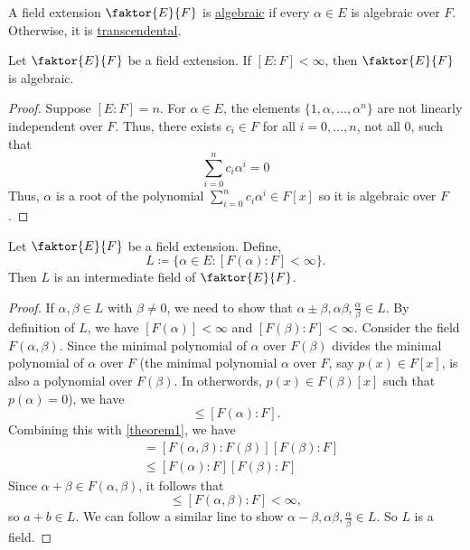 \documentclass[11pt]{article}
\newcommand{\quotient}[2]{\faktor{#1}{#2}}
\begin{document}
\begin{definition}
A field extension $\quotient{E}{F}$ is \underline{algebraic} if every $\alpha
\in E$ is algebraic over $F$. Otherwise, it is \underline{transcendental}.
\end{definition}
\begin{theorem} \label{theorem6}
Let $\quotient{E}{F}$ be a field extension. If $[E:F] < \infty$, then
$\quotient{E}{F}$ is algebraic.
\end{theorem}
\begin{proof}
Suppose $[E:F] = n$. For $\alpha \in E$, the elements $\{1, \alpha, \dots,
\alpha^n\}$ are not linearly independent over $F$. Thus, there exists $c_i \in
F$ for all $i = 0, \dots , n$, not all 0, such that
\begin{equation*}
\sum^n_{i = 0} c_i\alpha^i = 0
\end{equation*}
Thus, $\alpha$ is a root of the polynomial $\sum^n_{i = 0} c_i\alpha^i \in
F[x]$ so it is algebraic over $F$.
\end{proof}
\begin{theorem}
Let $\quotient{E}{F}$ be a field extension. Define,
\begin{equation*}
L \coloneqq \{\alpha \in E: [F(\alpha) : F] < \infty\}.
\end{equation*}
Then $L$ is an intermediate field of $\quotient{E}{F}$.
\end{theorem}
\begin{proof}
If $\alpha, \beta \in L$ with $\beta \neq 0$, we need to show that $\alpha \pm
\beta, \alpha\beta, \frac{\alpha}{\beta} \in L$. By definition of $L$, we have
$[F(\alpha)] < \infty$ and $[F(\beta) : F] < \infty$. Consider the field
$F(\alpha, \beta)$. Since the minimal polynomial of $\alpha$ over $F(\beta)$
divides the minimal polynomial of $\alpha $ over $F$ (the minimal polynomial
$\alpha$ over $F$, say $p(x) \in F[x]$, is also a polynomial over $F(\beta)$.
In otherwords, $p(x) \in F(\beta)[x]$ such that $p(\alpha) = 0$), we have
\begin{equation*}
[F(\alpha, \beta):F(\beta)] \leq [F(\alpha):F].
\end{equation*}
Combining this with \cref{theorem1}, we have
\begin{align*}
[F(\alpha,\beta):F] &= [F(\alpha,\beta):F(\beta)][F(\beta):F]\\
&\leq [F(\alpha):F][F(\beta):F]
\end{align*}
Since $\alpha + \beta \in F(\alpha, \beta)$, it follows that
\begin{equation*}
[F(\alpha + \beta):F(\beta)] \leq [F(\alpha, \beta):F] < \infty,
\end{equation*}
so $a+b\in L$. We can follow a similar line to show $\alpha - \beta,
\alpha\beta, \frac{\alpha}{\beta} \in L$. So $L$ is a field.
\end{proof}
\end{document}
